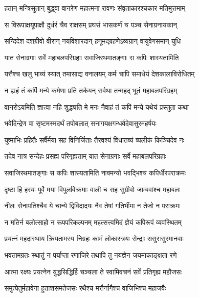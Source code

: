 
\twolineshloka
{हतान् मन्त्रिसुतान् बुद्ध्वा वानरेण महात्मना}
{रावणः संवृताकारश्चकार मतिमुत्तमाम्} %

\twolineshloka
{स विरूपाक्षयूपाक्षौ दुर्धरं चैव राक्षसम्}
{प्रघसं भासकर्णं च पञ्च सेनाग्रनायकान्} %

\twolineshloka
{सन्दिदेश दशग्रीवो वीरान् नयविशारदान्}
{हनूमद्ग्रहणेऽव्यग्रान् वायुवेगसमान् युधि} %

\twolineshloka
{यात सेनाग्रगाः सर्वे महाबलपरिग्रहाः}
{सवाजिरथमातङ्गाः स कपिः शास्यतामिति} %

\twolineshloka
{यत्तैश्च खलु भाव्यं स्यात् तमासाद्य वनालयम्}
{कर्म चापि समाधेयं देशकालाविरोधितम्} %

\twolineshloka
{न ह्यहं तं कपिं मन्ये कर्मणा प्रति तर्कयन्}
{सर्वथा तन्महद् भूतं महाबलपरिग्रहम्} %

\twolineshloka
{वानरोऽयमिति ज्ञात्वा नहि शुद्ध्यति मे मनः}
{नैवाहं तं कपिं मन्ये यथेयं प्रस्तुता कथा} %

\twolineshloka
{भवेदिन्द्रेण वा सृष्टमस्मदर्थं तपोबलात्}
{सनागयक्षगन्धर्वदेवासुरमहर्षयः} %

\twolineshloka
{युष्माभिः प्रहितैः सर्वैर्मया सह विनिर्जिताः}
{तैरवश्यं विधातव्यं व्यलीकं किञ्चिदेव नः} %

\twolineshloka
{तदेव नात्र सन्देहः प्रसह्य परिगृह्यताम्}
{यात सेनाग्रगाः सर्वे महाबलपरिग्रहाः} %

\twolineshloka
{सवाजिरथमातङ्गाः स कपिः शास्यतामिति}
{नावमन्यो भवद्भिश्च कपिर्धीरपराक्रमः} %

\twolineshloka
{दृष्टा हि हरयः पूर्वे मया विपुलविक्रमाः}
{वाली च सह सुग्रीवो जाम्बवांश्च महाबलः} %

\twolineshloka
{नीलः सेनापतिश्चैव ये चान्ये द्विविदादयः}
{नैव तेषां गतिर्भीमा न तेजो न पराक्रमः} %

\twolineshloka
{न मतिर्न बलोत्साहो न रूपपरिकल्पनम्}
{महत्सत्त्वमिदं ज्ञेयं कपिरूपं व्यवस्थितम्} %

\twolineshloka
{प्रयत्नं महदास्थाय क्रियतामस्य निग्रहः}
{कामं लोकास्त्रयः सेन्द्राः ससुरासुरमानवाः} %

\twolineshloka
{भवतामग्रतः स्थातुं न पर्याप्ता रणाजिरे}
{तथापि तु नयज्ञेन जयमाकाङ्क्षता रणे} %

\twolineshloka
{आत्मा रक्ष्यः प्रयत्नेन युद्धसिद्धिर्हि चञ्चला}
{ते स्वामिवचनं सर्वे प्रतिगृह्य महौजसः} %

\twolineshloka
{समुत्पेतुर्महावेगा हुताशसमतेजसः}
{रथैश्च मत्तैर्नागैश्च वाजिभिश्च महाजवैः} %

